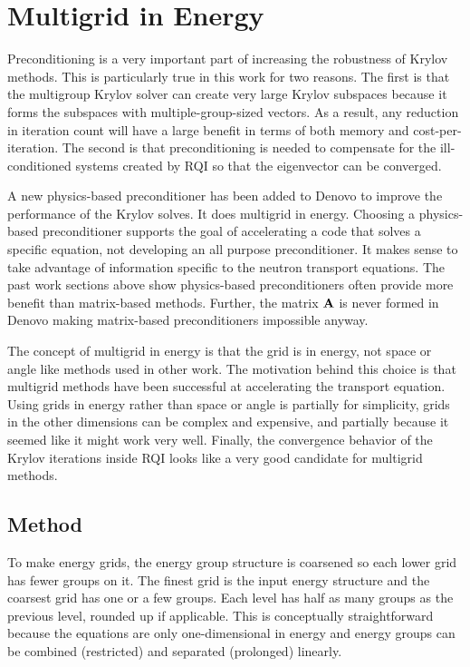 \section{Multigrid in Energy}
Preconditioning is a very important part of increasing the robustness of Krylov methods. This is particularly true in this work for two reasons. The first is that the multigroup Krylov solver can create very large Krylov subspaces because it forms the subspaces with multiple-group-sized vectors. As a result, any reduction in iteration count will have a large benefit in terms of both memory and cost-per-iteration. The second is that preconditioning is needed to compensate for the ill-conditioned systems created by RQI so that the eigenvector can be converged. 

A new physics-based preconditioner has been added to Denovo to improve the performance of the Krylov solves. It does multigrid in energy. Choosing a physics-based preconditioner supports the goal of accelerating a code that solves a specific equation, not developing an all purpose preconditioner. It makes sense to take advantage of information specific to the neutron transport equations. The past work sections above show physics-based preconditioners often provide more benefit than matrix-based methods. Further, the matrix $\mathbf{A}$ is never formed in Denovo making matrix-based preconditioners impossible anyway. 

The concept of multigrid in energy is that the grid is in energy, not space or angle like methods used in other work. The motivation behind this choice is that multigrid methods have been successful at accelerating the transport equation. Using grids in energy rather than space or angle is partially for simplicity, grids in the other dimensions can be complex and expensive, and partially because it seemed like it might work very well. Finally, the convergence behavior of the Krylov iterations inside RQI looks like a very good candidate for multigrid methods. 

\subsection{Method}
To make energy grids, the energy group structure is coarsened so each lower grid has fewer groups on it. The finest grid is the input energy structure and the coarsest grid has one or a few groups. Each level has half as many groups as the previous level, rounded up if applicable. This is conceptually straightforward because the equations are only one-dimensional in energy and energy groups can be combined (restricted) and separated (prolonged) linearly. 

